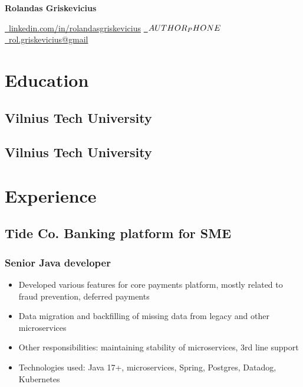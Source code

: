 \documentclass[11pt]{article}
\begin{document}


\begin{center}
  {\Huge\bfseries Rolandas Griskevicius} \\ \medskip

  \href{linkedin.com/in/rolandasgriskevicius}{\faLinkedin~linkedin.com/in/rolandasgriskevicius} \quad
  \href{tel:$\authorphone$}{\faPhone~$AUTHOR_PHONE$} \quad
  \href{mailto:rol.griskevicius@gmail}{\faEnvelope~rol.griskevicius@gmail} \quad
\end{center}

\section{Education}
\subsection{Vilnius Tech University  }
\subsection{Vilnius Tech University  }


\section{Experience}

\subsection{Tide Co. Banking platform for SME}
\subsubsection{Senior Java developer }
\begin{itemize}
\item Developed various features for core payments platform, mostly related to fraud prevention, deferred payments
\item Data migration and backfilling of missing data from legacy and other microservices
\item Other responsibilities: maintaining stability of microservices, 3rd line support
\item Technologies used: Java 17+, microservices, Spring, Postgres, Datadog, Kubernetes
\end{itemize}
\end{document}
